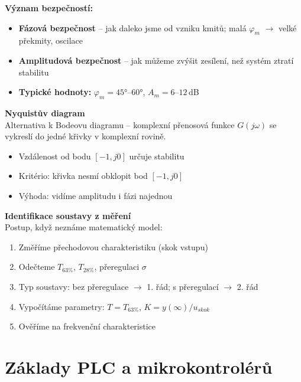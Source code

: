 \documentclass[a4paper,10pt]{article}
\begin{document}
\begin{vysvetlenibox}
\textbf{Význam bezpečností:}
\begin{itemize}[noitemsep, leftmargin=1.4em, topsep=4pt]
    \item \textbf{Fázová bezpečnost} -- jak daleko jsme od vzniku kmitů;
          malá $\varphi_m$ $\to$ velké překmity, oscilace
    \item \textbf{Amplitudová bezpečnost} -- jak můžeme zvýšit zesílení,
          než systém ztratí stabilitu
    \item \textbf{Typické hodnoty:} $\varphi_m = 45°\text{--}60°$, $A_m = 6\text{--}12$\,dB
\end{itemize}

\textbf{Nyquistův diagram}\\
Alternativa k Bodeovu diagramu -- komplexní přenosová funkce
$G(j\omega)$ se vykreslí do jedné křivky v komplexní rovině.
\begin{itemize}[noitemsep, leftmargin=1.4em, topsep=4pt]
    \item Vzdálenost od bodu $[-1, j0]$ určuje stabilitu
    \item Kritério: křivka nesmí obklopit bod $[-1, j0]$
    \item Výhoda: vidíme amplitudu i fázi najednou
\end{itemize}

\textbf{Identifikace soustavy z měření}\\
Postup, když neznáme matematický model:
\begin{enumerate}[noitemsep, leftmargin=1.4em, topsep=4pt]
    \item Změříme přechodovou charakteristiku (skok vstupu)
    \item Odečteme $T_{63\%}$, $T_{28\%}$, přeregulaci $\sigma$
    \item Typ soustavy: bez přeregulace $\to$ 1. řád; s přeregulací $\to$ 2. řád
    \item Vypočítáme parametry: $T = T_{63\%}$, $K = y(\infty)/u_{skok}$
    \item Ověříme na frekvenční charakteristice
\end{enumerate}
\end{vysvetlenibox}




\newpage


\section{Základy PLC a mikrokontrolérů}
\end{document}
